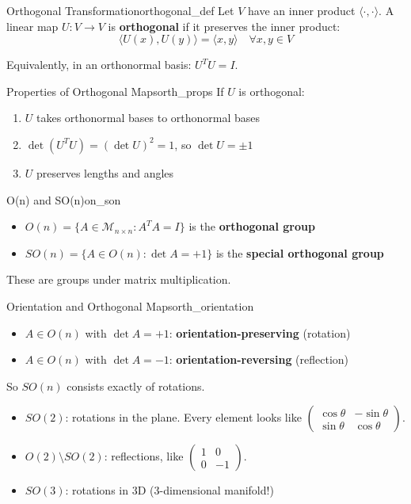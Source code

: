 \documentclass[11pt, letterpaper, openany]{book}
\begin{document}
\begin{defn}{Orthogonal Transformation}{orthogonal_def}
Let $V$ have an inner product $\langle \cdot, \cdot \rangle$. A linear map $U: V \to V$ is \textbf{orthogonal} if it preserves the inner product:
\[\langle U(x), U(y) \rangle = \langle x, y \rangle \quad \forall x, y \in V\]

Equivalently, in an orthonormal basis: $U^T U = I$.
\end{defn}

\begin{thm}{Properties of Orthogonal Maps}{orth_props}
If $U$ is orthogonal:
\begin{enumerate}
    \item $U$ takes orthonormal bases to orthonormal bases
    \item $\det(U^T U) = (\det U)^2 = 1$, so $\det U = \pm 1$
    \item $U$ preserves lengths and angles
\end{enumerate}
\end{thm}

\begin{defn}{O(n) and SO(n)}{on_son}
\begin{itemize}
    \item $O(n) = \{A \in \mathcal{M}_{n \times n} : A^T A = I\}$ is the \textbf{orthogonal group}
    \item $SO(n) = \{A \in O(n) : \det A = +1\}$ is the \textbf{special orthogonal group}
\end{itemize}
These are groups under matrix multiplication.
\end{defn}

\begin{thm}{Orientation and Orthogonal Maps}{orth_orientation}
\begin{itemize}
    \item $A \in O(n)$ with $\det A = +1$: \textbf{orientation-preserving} (rotation)
    \item $A \in O(n)$ with $\det A = -1$: \textbf{orientation-reversing} (reflection)
\end{itemize}
So $SO(n)$ consists exactly of rotations.
\end{thm}

\begin{example}
\begin{itemize}
    \item $SO(2)$: rotations in the plane. Every element looks like $\begin{pmatrix} \cos\theta & -\sin\theta \\ \sin\theta & \cos\theta \end{pmatrix}$.
    \item $O(2) \setminus SO(2)$: reflections, like $\begin{pmatrix} 1 & 0 \\ 0 & -1 \end{pmatrix}$.
    \item $SO(3)$: rotations in 3D (3-dimensional manifold!)
\end{itemize}
\end{example}
\end{document}
